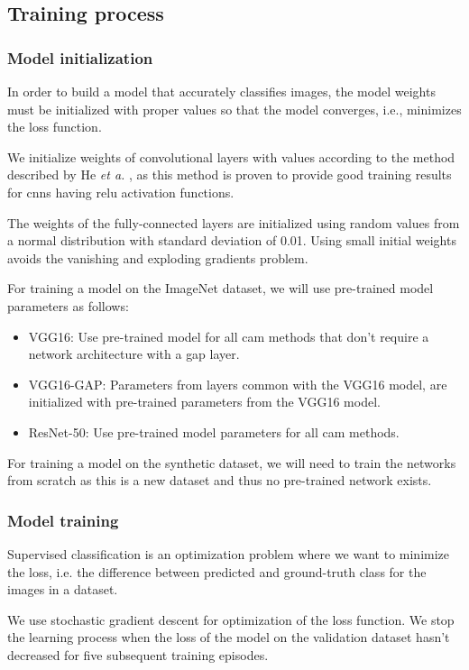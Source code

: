\subsection{Training process}
\subsubsection{Model initialization}
In order to build a model that accurately classifies images, the model weights must be initialized with proper values so that the model converges, i.e., minimizes the loss function.

We initialize weights of convolutional layers with values according to the method described by He \textit{et a.} \cite{he2015delving}, as this method is proven to provide good training results for \acrshort{cnn}s having \acrshort{relu} activation functions.

The weights of the fully-connected layers are initialized using random values from a normal distribution with standard deviation of 0.01. Using small initial weights avoids the vanishing and exploding gradients problem.

For training a model on the ImageNet dataset, we will use pre-trained model parameters as follows:
\begin{itemize}
    \item VGG16: Use pre-trained model for all \acrshort{cam} methods that don't require a network architecture with a \acrshort{gap} layer.
    \item VGG16-GAP: Parameters from layers common with the VGG16 model, are initialized with pre-trained parameters from the VGG16 model.
    \item ResNet-50: Use pre-trained model parameters for all \acrshort{cam} methods.
\end{itemize}

For training a model on the synthetic dataset, we will need to train the networks from scratch as this is a new dataset and thus no pre-trained network exists.

\subsubsection{Model training}
Supervised classification is an optimization problem where we want to minimize the loss, i.e. the difference between predicted and ground-truth class for the images in a dataset.

We use stochastic gradient descent for optimization of the loss function. We stop the learning process when the loss of the model on the validation dataset hasn't decreased for five subsequent training episodes.

